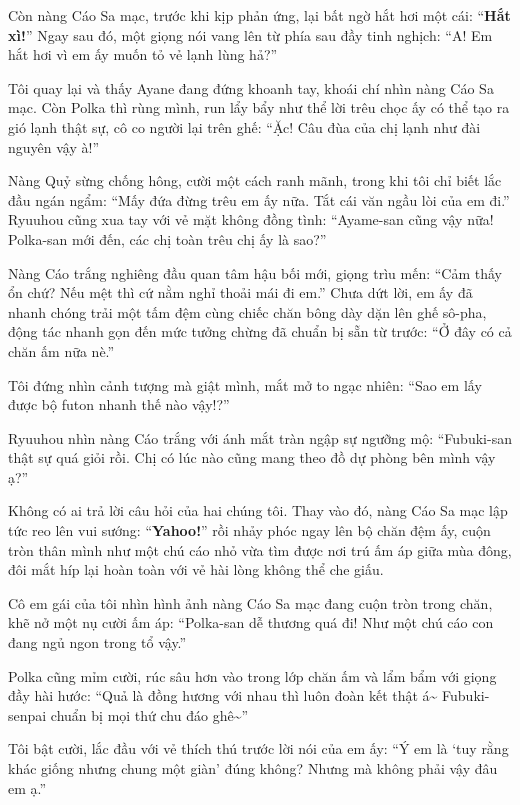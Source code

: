 \documentclass[../main.tex]{subfiles}
\begin{document}

Còn nàng Cáo Sa mạc, trước khi kịp phản ứng, lại bất ngờ hắt hơi một cái: ``\textbf{Hắt xì!}'' Ngay sau đó, một giọng nói vang lên từ phía sau đầy tinh nghịch: ``A! Em hắt hơi vì em ấy muốn tỏ vẻ lạnh lùng hả?''

Tôi quay lại và thấy Ayane đang đứng khoanh tay, khoái chí nhìn nàng Cáo Sa mạc. Còn Polka thì rùng mình, run lẩy bẩy như thể lời trêu chọc ấy có thể tạo ra gió lạnh thật sự, cô co người lại trên ghế: ``Ặc! Câu đùa của chị lạnh như đài nguyên vậy à!''

Nàng Quỷ sừng chống hông, cười một cách ranh mãnh, trong khi tôi chỉ biết lắc đầu ngán ngẩm: ``Mấy đứa đừng trêu em ấy nữa. Tắt cái văn ngầu lòi của em đi.'' Ryuuhou cũng xua tay với vẻ mặt không đồng tình: ``Ayame-san cũng vậy nữa! Polka-san mới đến, các chị toàn trêu chị ấy là sao?''

Nàng Cáo trắng nghiêng đầu quan tâm hậu bối mới, giọng trìu mến: ``Cảm thấy ổn chứ? Nếu mệt thì cứ nằm nghỉ thoải mái đi em.'' Chưa dứt lời, em ấy đã nhanh chóng trải một tấm đệm cùng chiếc chăn bông dày dặn lên ghế sô-pha, động tác nhanh gọn đến mức tưởng chừng đã chuẩn bị sẵn từ trước: ``Ở đây có cả chăn ấm nữa nè.''


Tôi đứng nhìn cảnh tượng mà giật mình, mắt mở to ngạc nhiên: ``Sao em lấy được bộ futon nhanh thế nào vậy!?''

Ryuuhou nhìn nàng Cáo trắng với ánh mắt tràn ngập sự ngưỡng mộ: ``Fubuki-san thật sự quá giỏi rồi. Chị có lúc nào cũng mang theo đồ dự phòng bên mình vậy ạ?''

Không có ai trả lời câu hỏi của hai chúng tôi. Thay vào đó, nàng Cáo Sa mạc lập tức reo lên vui sướng: ``\textbf{Yahoo!}'' rồi nhảy phóc ngay lên bộ chăn đệm ấy, cuộn tròn thân mình như một chú cáo nhỏ vừa tìm được nơi trú ấm áp giữa mùa đông, đôi mắt híp lại hoàn toàn với vẻ hài lòng không thể che giấu.

Cô em gái của tôi nhìn hình ảnh nàng Cáo Sa mạc đang cuộn tròn trong chăn, khẽ nở một nụ cười ấm áp: ``Polka-san dễ thương quá đi! Như một chú cáo con đang ngủ ngon trong tổ vậy.''

Polka cũng mỉm cười, rúc sâu hơn vào trong lớp chăn ấm và lẩm bẩm với giọng đầy hài hước: ``Quả là đồng hương với nhau thì luôn đoàn kết thật á\~{} Fubuki-senpai chuẩn bị mọi thứ chu đáo ghê\~{}''

Tôi bật cười, lắc đầu với vẻ thích thú trước lời nói của em ấy: ``Ý em là `tuy rằng khác giống nhưng chung một giàn' đúng không? Nhưng mà không phải vậy đâu em ạ.''
\end{document}
